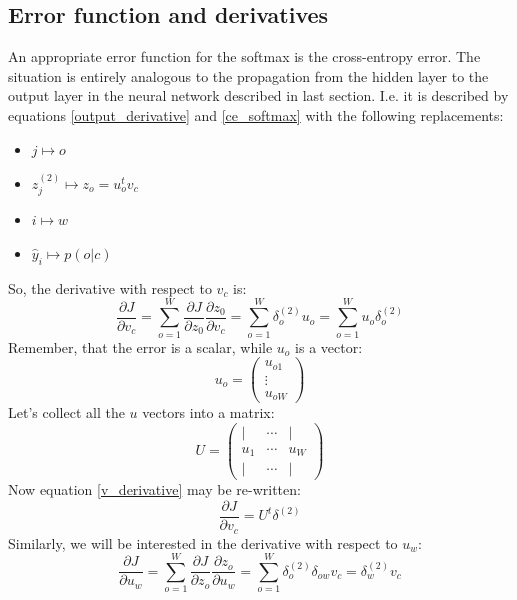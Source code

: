 \documentclass[12pt, a4paper]{article}
\numberwithin{equation}{section}
\begin{document}
\subsection{Error function and derivatives}
An appropriate error function for the softmax is the cross-entropy error. The situation is entirely analogous to the propagation from the hidden layer to the output layer in the neural network described in last section. I.e. it is described by equations \ref{output_derivative} and \ref{ce_softmax} with the following replacements:
\begin{itemize}
\item $j\mapsto o$
\item $z^{(2)}_j\mapsto z_o=u^t_o v_c$
\item $i\mapsto w$
\item $\hat{y}_i\mapsto p(o|c)$
\end{itemize}
So, the derivative with respect to $v_c$ is:
\begin{equation}
\label{v_derivative}
\frac{\partial J}{\partial v_c}=\sum_{o=1}^W\frac{\partial J}{\partial z_0}\frac{\partial z_0}{\partial v_c}=\sum_{o=1}^W\delta^{(2)}_o u_o=\sum_{o=1}^W u_o\delta^{(2)}_o
\end{equation}
Remember, that the error is a scalar, while $u_o$ is a vector:
\begin{equation}
u_o=
\begin{pmatrix}
u_{o1} \\ \vdots \\ u_{oW} 
\end{pmatrix}
\end{equation}
Let's collect all the $u$ vectors into a matrix:
\begin{equation}
U=
\begin{pmatrix}
| & \cdots & | \\
u_1 & \cdots & u_W \\
| & \cdots & |
\end{pmatrix}
\end{equation}
Now equation \ref{v_derivative} may be re-written:
\begin{equation}
\frac{\partial J}{\partial v_c}=U^t\delta^{(2)}
\end{equation}
Similarly, we will be interested in the derivative with respect to $u_w$:
\begin{equation}
\label{u_derivative}
\frac{\partial J}{\partial u_w}=\sum_{o=1}^W\frac{\partial J}{\partial z_o}\frac{\partial z_o}{\partial u_w}=\sum_{o=1}^W\delta^{(2)}_o\delta_{ow}v_c=\delta^{(2)}_w v_c
\end{equation}
\end{document}
